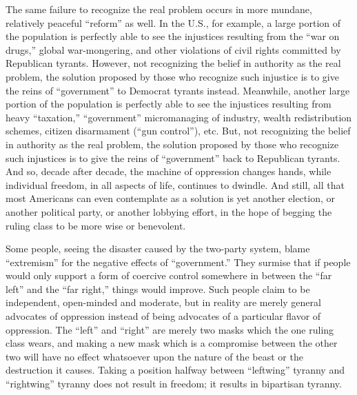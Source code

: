 \documentclass{book}
\begin{document}
The same failure to recognize the real problem occurs in more mundane, relatively peaceful \enquote{reform} as well. In the U.S., for example, a large portion of the population is perfectly able to see the injustices resulting from the \enquote{war on drugs,} global war-mongering, and other violations of civil rights committed by Republican tyrants. However, not recognizing the belief in authority as the real problem, the solution proposed by those who recognize such injustice is to give the reins of \enquote{government} to Democrat tyrants instead. Meanwhile, another large portion of the population is perfectly able to see the injustices resulting from heavy \enquote{taxation,} \enquote{government} micromanaging of industry, wealth redistribution schemes, citizen disarmament (\enquote{gun control}), etc. But, not recognizing the belief in authority as the real problem, the solution proposed by those who recognize such injustices is to give the reins of \enquote{government} back to Republican tyrants. And so, decade after decade, the machine of oppression changes hands, while individual freedom, in all aspects of life, continues to dwindle. And still, all that most Americans can even contemplate as a solution is yet another election, or another political party, or another lobbying effort, in the hope of begging the ruling class to be more wise or benevolent.

Some people, seeing the disaster caused by the two-party system, blame \enquote{extremism} for the negative effects of \enquote{government.} They surmise that if people would only support a form of coercive control somewhere in between the \enquote{far left} and the \enquote{far right,} things would improve. Such people claim to be independent, open-minded and moderate, but in reality are merely general advocates of oppression instead of being advocates of a particular flavor of oppression. The \enquote{left} and \enquote{right} are merely two masks which the one ruling class wears, and making a new mask which is a compromise between the other two will have no effect whatsoever upon the nature of the beast or the destruction it causes. Taking a position halfway between \enquote{leftwing} tyranny and \enquote{rightwing} tyranny does not result in freedom; it results in bipartisan tyranny.
\end{document}
